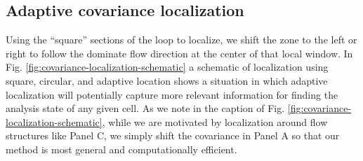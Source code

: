 \subsection{Adaptive covariance localization}

Using the ``square'' sections of the loop to localize, we shift the zone to the left or right to follow the dominate flow direction at the center of that local window.
In Fig. \ref{fig:covariance-localization-schematic} a schematic of localization using square, circular, and adaptive location shows a situation in which adaptive localization will potentially capture more relevant information for finding the analysis state of any given cell.
As we note in the caption of Fig. \ref{fig:covariance-localization-schematic}, while we are motivated by localization around flow structures like Panel C, we simply shift the covariance in Panel A so that our method is most general and computationally efficient.


